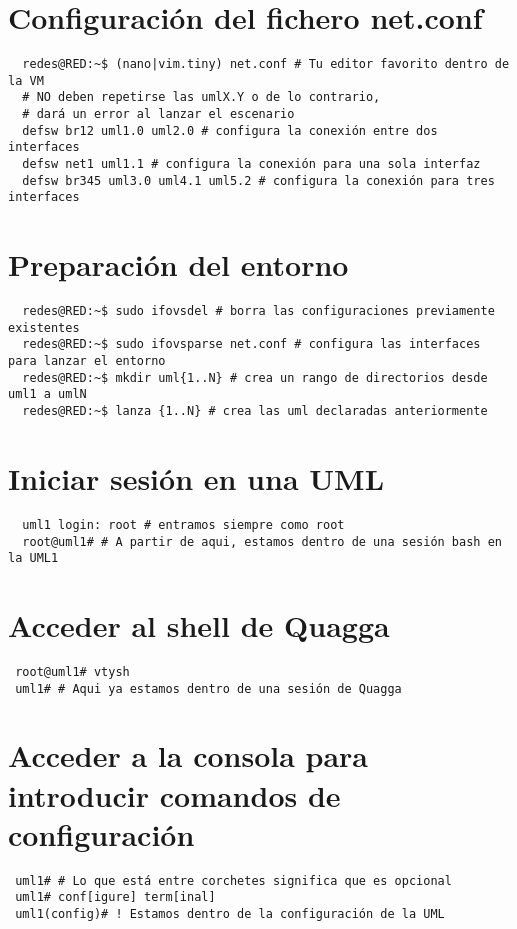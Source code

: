 \documentclass{article}
\begin{document}
\tableofcontents
\newpage

\section{Configuración del fichero net.conf}
\begin{verbatim}
  redes@RED:~$ (nano|vim.tiny) net.conf # Tu editor favorito dentro de la VM
  # NO deben repetirse las umlX.Y o de lo contrario,
  # dará un error al lanzar el escenario
  defsw br12 uml1.0 uml2.0 # configura la conexión entre dos interfaces
  defsw net1 uml1.1 # configura la conexión para una sola interfaz
  defsw br345 uml3.0 uml4.1 uml5.2 # configura la conexión para tres interfaces
\end{verbatim}

\section{Preparación del entorno}
\begin{verbatim}
  redes@RED:~$ sudo ifovsdel # borra las configuraciones previamente existentes
  redes@RED:~$ sudo ifovsparse net.conf # configura las interfaces para lanzar el entorno
  redes@RED:~$ mkdir uml{1..N} # crea un rango de directorios desde uml1 a umlN
  redes@RED:~$ lanza {1..N} # crea las uml declaradas anteriormente
\end{verbatim}

\section{Iniciar sesión en una UML}
\begin{verbatim}
  uml1 login: root # entramos siempre como root
  root@uml1# # A partir de aqui, estamos dentro de una sesión bash en la UML1
\end{verbatim}

\section{Acceder al shell de Quagga}
\begin{verbatim}
 root@uml1# vtysh
 uml1# # Aqui ya estamos dentro de una sesión de Quagga
\end{verbatim}

\section{Acceder a la consola para introducir comandos de configuración}
\begin{verbatim}
 uml1# # Lo que está entre corchetes significa que es opcional
 uml1# conf[igure] term[inal]
 uml1(config)# ! Estamos dentro de la configuración de la UML
\end{verbatim}
\end{document}
